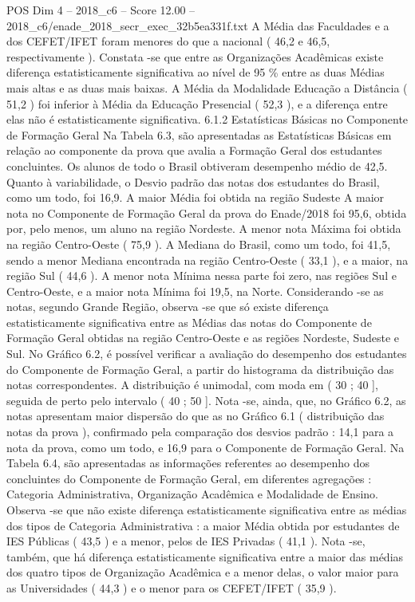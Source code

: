 \begin{textsample}{POS Dim 4 – 2018\_c6 – Score 12.00 – 2018\_c6/enade\_2018\_secr\_exec\_32b5ea331f.txt}
A Média das Faculdades e a dos CEFET/IFET foram menores do que a nacional ( 46,2 e 46,5, respectivamente ).
Constata -se que entre as Organizações Acadêmicas existe diferença estatisticamente significativa ao nível de 95 \% entre as duas Médias mais altas e as duas mais baixas.
A Média da Modalidade Educação a Distância ( 51,2 ) foi inferior à Média da Educação Presencial ( 52,3 ), e a diferença entre elas não é estatisticamente significativa. 6.1.2 Estatísticas Básicas no Componente de Formação Geral Na Tabela 6.3, são apresentadas as Estatísticas Básicas em relação ao componente da prova que avalia a Formação Geral dos estudantes concluintes.
Os alunos de todo o Brasil obtiveram desempenho médio de 42,5.
Quanto à variabilidade, o Desvio padrão das notas dos estudantes do Brasil, como um todo, foi 16,9.
A maior Média foi obtida na região Sudeste A maior nota no Componente de Formação Geral da prova do Enade/2018 foi 95,6, obtida por, pelo menos, um aluno na região Nordeste.
A menor nota Máxima foi obtida na região Centro-Oeste ( 75,9 ).
A Mediana do Brasil, como um todo, foi 41,5, sendo a menor Mediana encontrada na região Centro-Oeste ( 33,1 ), e a maior, na região Sul ( 44,6 ).
A menor nota Mínima nessa parte foi zero, nas regiões Sul e Centro-Oeste, e a maior nota Mínima foi 19,5, na Norte.
Considerando -se as notas, segundo Grande Região, observa -se que só existe diferença estatisticamente significativa entre as Médias das notas do Componente de Formação Geral obtidas na região Centro-Oeste e as regiões Nordeste, Sudeste e Sul.
No Gráfico 6.2, é possível verificar a avaliação do desempenho dos estudantes do Componente de Formação Geral, a partir do histograma da distribuição das notas correspondentes.
A distribuição é unimodal, com moda em ( 30 ; 40 ], seguida de perto pelo intervalo ( 40 ; 50 ].
Nota -se, ainda, que, no Gráfico 6.2, as notas apresentam maior dispersão do que as no Gráfico 6.1 ( distribuição das notas da prova ), confirmado pela comparação dos desvios padrão : 14,1 para a nota da prova, como um todo, e 16,9 para o Componente de Formação Geral.
Na Tabela 6.4, são apresentadas as informações referentes ao desempenho dos concluintes do Componente de Formação Geral, em diferentes agregações : Categoria Administrativa, Organização Acadêmica e Modalidade de Ensino.
Observa -se que não existe diferença estatisticamente significativa entre as médias dos tipos de Categoria Administrativa : a maior Média obtida por estudantes de IES Públicas ( 43,5 ) e a menor, pelos de IES Privadas ( 41,1 ).
Nota -se, também, que há diferença estatisticamente significativa entre a maior das médias dos quatro tipos de Organização Acadêmica e a menor delas, o valor maior para as Universidades ( 44,3 ) e o menor para os CEFET/IFET ( 35,9 ).

\end{textsample}
